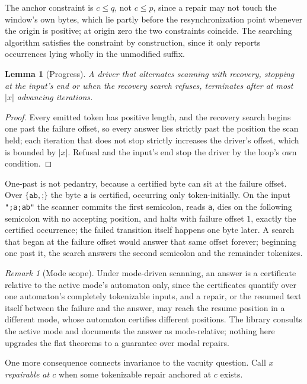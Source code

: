 \documentclass[11pt,a4paper]{article}
\theoremstyle{definition}
\theoremstyle{plain}
\newtheorem{lemma}{Lemma}
\theoremstyle{remark}
\newtheorem{remark}{Remark}
\newcommand{\code}[1]{\texttt{#1}}
\begin{document}
The anchor constraint is $c \le q$, not $c \le p$, since a repair may not touch the window's own bytes, which lie partly
before the resynchronization point whenever the origin is positive; at origin zero the two constraints coincide. The
searching algorithm satisfies the constraint by construction, since it only reports occurrences lying wholly in the
unmodified suffix.

\begin{lemma}[Progress]
A driver that alternates scanning with recovery, stopping at the input's end or when the recovery search refuses,
terminates after at most $|x|$ advancing iterations.
\end{lemma}

\begin{proof}
Every emitted token has positive length, and the recovery search begins one past the failure offset, so every answer
lies strictly past the position the scan held; each iteration that does not stop strictly increases the driver's offset,
which is bounded by $|x|$. Refusal and the input's end stop the driver by the loop's own condition.
\end{proof}

One-past is not pedantry, because a certified byte can sit at the failure offset. Over $\{\code{ab}, \code{;}\}$ the
byte \code{a} is certified, occurring only token-initially. On the input \code{";a;ab"} the scanner commits the first
semicolon, reads \code{a}, dies on the following semicolon with no accepting position, and halts with failure offset
$1$, exactly the certified occurrence; the failed transition itself happens one byte later. A search that began at the
failure offset would answer that same offset forever; beginning one past it, the search answers the second semicolon and
the remainder tokenizes.

\begin{remark}[Mode scope]
Under mode-driven scanning, an answer is a certificate relative to the active mode's automaton only, since the
certificates quantify over one automaton's completely tokenizable inputs, and a repair, or the resumed text itself
between the failure and the answer, may reach the resume position in a different mode, whose automaton certifies
different positions. The library consults the active mode and documents the answer as mode-relative; nothing here
upgrades the flat theorems to a guarantee over modal repairs.
\end{remark}

One more consequence connects invariance to the vacuity question. Call $x$ \emph{repairable at $c$} when some
tokenizable repair anchored at $c$ exists.
\end{document}

